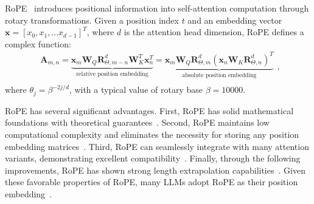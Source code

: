 RoPE~\citep{su2024roformer} introduces positional information into self-attention computation through rotary transformations. Given a position index $t$ and an embedding vector $\bm{x}=[x_0,x_1,...x_{d-1}]^T$, where $d$ is the attention head dimension, RoPE defines a complex function:
\begin{equation}\begin{gathered} \bm{A}_{m,n}=\underbrace{\bm{x}_{m}\bm{W}_{Q}\bm{R}_{\Theta,m-n}^d\bm{W}_{K}^{T}\bm{x}_{n}^{T}}_\text{relative position embedding}=\underbrace{\bm{x}_{m}\bm{W}_{Q}\bm{R}_{\Theta,m}^d\left(\bm{x}_{n}\bm{W}_{K}\bm{R}_{\Theta,n}^d\right)^T}_\text{absolute position embedding} \\[0.5ex]  
\end{gathered}\text{,}\end{equation}
where $\theta_j=\beta^{-2j/d}$, with a typical value of rotary base $\beta=10000$.

RoPE has several significant advantages. First, RoPE has solid mathematical foundations with theoretical guarantees~\citep{su2024roformer}. Second, RoPE maintains low computational complexity and eliminates the necessity for storing any position embedding matrices~\citep{su2024roformer,touvron2023llama,chowdhery2023palm}. Third, RoPE can seamlessly integrate with many attention variants, demonstrating excellent compatibility~\citep{su2024roformer}. Finally, through the following improvements, RoPE has shown strong length extrapolation capabilities~\citep{dynamicNTK,liuscaling}. Given these favorable properties of RoPE, many LLMs adopt RoPE as their position embedding~\citep{dubey2024llama,glm2024chatglm,wang2024qwen2,young2024yi,cai2024internlm2}. 

